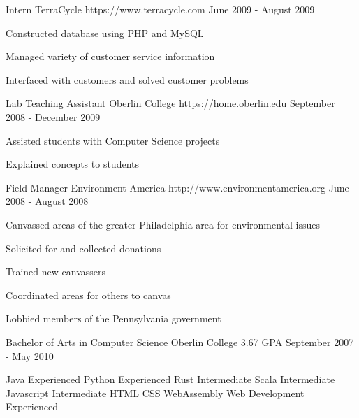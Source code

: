 \documentclass[11pt, a4paper]{awesome-cv}
\begin{document}
\begin{cventries}
{\begin{cvitems}
      \end{cvitems}
    }
  \cventry
    {Intern}
    {TerraCycle}
    {https://www.terracycle.com}
    {June 2009 - August 2009}
    {
      \begin{cvitems}
        \item {Constructed database using PHP and MySQL}\item {Managed variety of customer service information}\item {Interfaced with customers and solved customer problems}
      \end{cvitems}
    }
  \cventry
    {Lab Teaching Assistant}
    {Oberlin College}
    {https://home.oberlin.edu}
    {September 2008 - December 2009}
    {
      \begin{cvitems}
        \item {Assisted students with Computer Science projects}\item {Explained concepts to students}
      \end{cvitems}
    }
  \cventry
    {Field Manager}
    {Environment America}
    {http://www.environmentamerica.org}
    {June 2008 - August 2008}
    {
      \begin{cvitems}
        \item {Canvassed areas of the greater Philadelphia area for environmental issues}\item {Solicited for and collected donations}\item {Trained new canvassers}\item {Coordinated areas for others to canvas}\item {Lobbied members of the Pennsylvania government}
      \end{cvitems}
    }
\end{cventries}

\begin{cventries}
  \cventry
    {Bachelor of Arts in Computer Science}
    {Oberlin College}
    {3.67 GPA}
    {September 2007 - May 2010}
    {} %
\end{cventries}

\begin{cventries}
  \cventry
    {}
    {Java}
    {Experienced}
    {} %
    {} %
  \cventry
    {}
    {Python}
    {Experienced}
    {} %
    {} %
  \cventry
    {}
    {Rust}
    {Intermediate}
    {} %
    {} %
  \cventry
    {}
    {Scala}
    {Intermediate}
    {} %
    {} %
  \cventry
    {}
    {Javascript}
    {Intermediate}
    {} %
    {} %
  \cventry
    {HTML \quad CSS \quad WebAssembly \quad }
    {Web Development}
    {Experienced}
    {} %
    {} %
\end{cventries}
\end{document}
